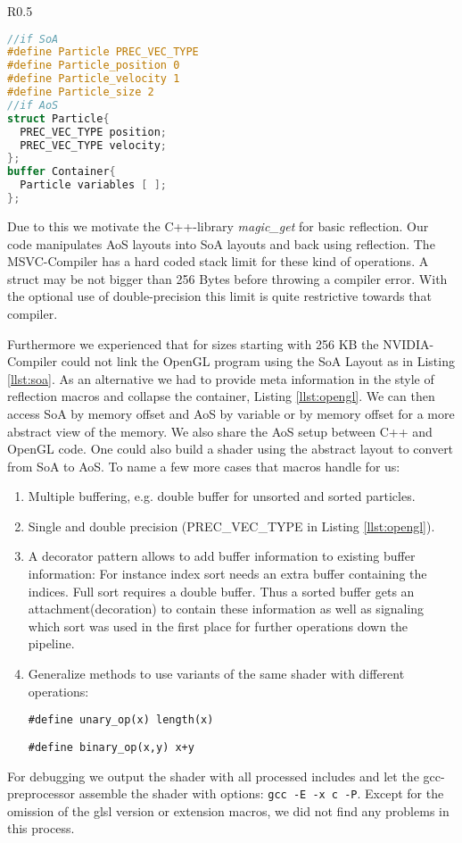 \documentclass[m,times]{cgMA}
\begin{document}
\noindent\begin{wrapfigure}{R}{0.5\textwidth}
\hfill\begin{minipage}{0.45\textwidth}
\begin{lstlisting}[caption={OpenGL Layout},label={llst:opengl},language={GLSL},style={GL}]
//if SoA
#define Particle PREC_VEC_TYPE
#define Particle_position 0
#define Particle_velocity 1
#define Particle_size 2
//if AoS
struct Particle{
  PREC_VEC_TYPE position;
  PREC_VEC_TYPE velocity;
};
buffer Container{
  Particle variables [ ];
};
\end{lstlisting}
\end{minipage}
\end{wrapfigure}

Due to this we motivate the C++-library \textit{magic\_get} \cite{APOLUKHIN:MAGIC_GET} for basic reflection. Our code manipulates AoS layouts into SoA layouts and back using reflection. The MSVC-Compiler has a hard coded stack limit for these kind of operations. A struct may be not bigger than 256 Bytes before throwing a compiler error. With the optional use of double-precision this limit is quite restrictive towards that compiler.

Furthermore we experienced that for sizes starting with 256 KB the NVIDIA-Compiler could not link the OpenGL program using the SoA Layout as in Listing \ref{llst:soa}. As an alternative we had to provide meta information in the style of reflection macros and collapse the container, Listing \ref{llst:opengl}. We can then access SoA by memory offset and AoS by variable or by memory offset for a more abstract view of the memory. We also share the AoS setup between C++ and OpenGL code. One could also build a shader using the abstract layout to convert from SoA to AoS.
To name a few more cases that macros handle for us:
\begin{enumerate}
  \item Multiple buffering, e.g. double buffer for unsorted and sorted particles.
  \item Single and double precision (PREC\_VEC\_TYPE in Listing \ref{llst:opengl}).
  \item A decorator pattern allows to add buffer information to existing buffer information: For instance index sort needs an extra buffer containing the indices. Full sort requires a double buffer. Thus a sorted buffer gets an attachment(decoration) to contain these information as well as signaling which sort was used in the first place for further operations down the pipeline.
  \item Generalize methods to use variants of the same shader with different operations:

    \texttt{\#define unary\_op(x) length(x)}

    \texttt{\#define binary\_op(x,y) x+y}
\end{enumerate}
For debugging we output the shader with all processed includes and let the gcc-preprocessor assemble the shader with options: \texttt{gcc -E -x c -P}. Except for the omission of the glsl version or extension macros, we did not find any problems in this process.
\end{document}
